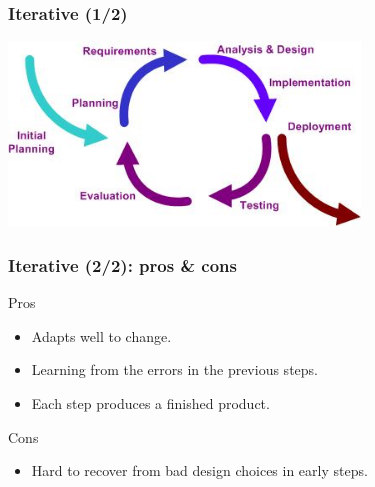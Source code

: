 \documentclass[10pt, handout]{beamer}
\begin{document}
\begin{frame}[fragile]
  \frametitle{Iterative (1/2)}
  \begin{center}
    \includegraphics[width=0.7\textwidth]{iterative_model}
  \end{center}
\end{frame}
\begin{frame}[fragile]
  \frametitle{Iterative (2/2): pros \& cons}
  \begin{exampleblock}{Pros}
    \begin{itemize}
    \item Adapts well to change.
    \item Learning from the errors in the previous steps.
    \item Each step produces a finished product.
    \end{itemize}
  \end{exampleblock}
  \begin{alertblock}{Cons}
    \begin{itemize}
    \item Hard to recover from bad design choices in early steps.
    \end{itemize}
  \end{alertblock}
\end{frame}
\end{document}
